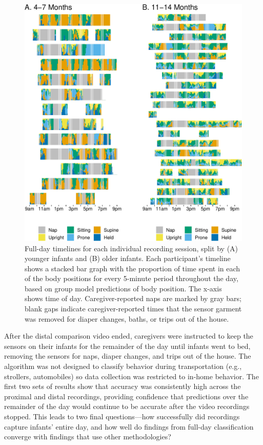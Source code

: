 \documentclass[
  man]{apa6}
\begin{document}
\begin{figure}

{\centering \includegraphics{manuscript_files/figure-latex/timelines-1} 

}

\caption{Full-day timelines for each individual recording session, split by (A) younger infants and (B) older infants. Each participant's timeline shows a stacked bar graph with the proportion of time spent in each of the body positions for every 5-minute period throughout the day, based on group model predictions of body position. The x-axis shows time of day. Caregiver-reported naps are marked by gray bars; blank gaps indicate caregiver-reported times that the sensor garment was removed for diaper changes, baths, or trips out of the house.}\label{fig:timelines}
\end{figure}

After the distal comparison video ended, caregivers were instructed to keep the sensors on their infants for the remainder of the day until infants went to bed, removing the sensors for naps, diaper changes, and trips out of the house. The algorithm was not designed to classify behavior during transportation (e.g., strollers, automobiles) so data collection was restricted to in-home behavior. The first two sets of results show that accuracy was consistently high across the proximal and distal recordings, providing confidence that predictions over the remainder of the day would continue to be accurate after the video recordings stopped. This leads to two final questions---how successfully did recordings capture infants' entire day, and how well do findings from full-day classification converge with findings that use other methodologies?
\end{document}
